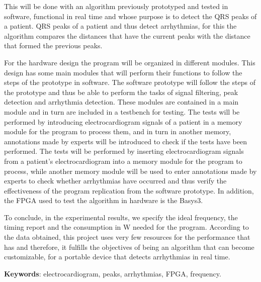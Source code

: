 This will be done with an algorithm previously prototyped and tested in software, functional in real time and whose purpose is to detect the QRS peaks of a patient.
QRS peaks of a patient and thus detect arrhythmias, for this the algorithm compares the distances that have the current peaks with the distance that formed the previous peaks.

For the hardware design the program will be organized in different modules. This design has some main modules that will perform their functions to follow the steps of the prototype in software.
The software prototype will follow the steps of the prototype and thus be able to perform the tasks of signal filtering, peak detection and arrhythmia detection.
These modules are contained in a main module and in turn are included in a testbench for testing. 
The tests will be performed by introducing electrocardiogram signals of a patient in a memory module for the program to process them, and in turn in another memory, annotations made by experts will be introduced to check if the tests have been performed.
The tests will be performed by inserting electrocardiogram signals from a patient's electrocardiogram into a memory module for the program to process, while another memory module will be used to enter annotations made by experts to check whether arrhythmias have occurred and thus verify the effectiveness of the program replication from the software prototype.  In addition, the FPGA used to test the algorithm in hardware is the Basys3.

To conclude, in the experimental results, we specify the ideal frequency, the timing report and the
consumption in W needed for the program. According to the data obtained, this project uses very few resources for the performance that has
and therefore, it fulfills the objectives of being an algorithm that can become customizable, for a portable device that detects arrhythmias in real time.

\noindent\textbf{Keywords}: electrocardiogram, peaks, arrhythmias, FPGA, frequency.